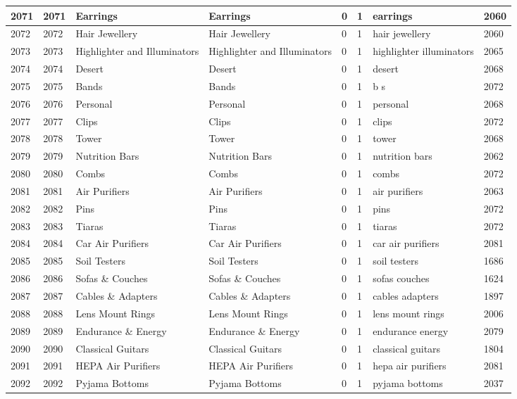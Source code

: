 \begin{longtable}{|l|l|l|l|l|l|l|l|}
2071 & 2071 & Earrings & Earrings & 0 & 1 & earrings & 2060 \\ \hline 
2072 & 2072 & Hair Jewellery & Hair Jewellery & 0 & 1 & hair jewellery & 2060 \\ \hline 
2073 & 2073 & Highlighter and Illuminators & Highlighter and Illuminators & 0 & 1 & highlighter illuminators & 2065 \\ \hline 
2074 & 2074 & Desert & Desert & 0 & 1 & desert & 2068 \\ \hline 
2075 & 2075 & Bands & Bands & 0 & 1 & b s & 2072 \\ \hline 
2076 & 2076 & Personal & Personal & 0 & 1 & personal & 2068 \\ \hline 
2077 & 2077 & Clips & Clips & 0 & 1 & clips & 2072 \\ \hline 
2078 & 2078 & Tower & Tower & 0 & 1 & tower & 2068 \\ \hline 
2079 & 2079 & Nutrition Bars & Nutrition Bars & 0 & 1 & nutrition bars & 2062 \\ \hline 
2080 & 2080 & Combs & Combs & 0 & 1 & combs & 2072 \\ \hline 
2081 & 2081 & Air Purifiers & Air Purifiers & 0 & 1 & air purifiers & 2063 \\ \hline 
2082 & 2082 & Pins & Pins & 0 & 1 & pins & 2072 \\ \hline 
2083 & 2083 & Tiaras & Tiaras & 0 & 1 & tiaras & 2072 \\ \hline 
2084 & 2084 & Car Air Purifiers & Car Air Purifiers & 0 & 1 & car air purifiers & 2081 \\ \hline 
2085 & 2085 & Soil Testers & Soil Testers & 0 & 1 & soil testers & 1686 \\ \hline 
2086 & 2086 & Sofas \& Couches & Sofas \& Couches & 0 & 1 & sofas couches & 1624 \\ \hline 
2087 & 2087 & Cables \& Adapters & Cables \& Adapters & 0 & 1 & cables adapters & 1897 \\ \hline 
2088 & 2088 & Lens Mount Rings & Lens Mount Rings & 0 & 1 & lens mount rings & 2006 \\ \hline 
2089 & 2089 & Endurance \& Energy & Endurance \& Energy & 0 & 1 & endurance energy & 2079 \\ \hline 
2090 & 2090 & Classical Guitars & Classical Guitars & 0 & 1 & classical guitars & 1804 \\ \hline 
2091 & 2091 & HEPA Air Purifiers & HEPA Air Purifiers & 0 & 1 & hepa air purifiers & 2081 \\ \hline 
2092 & 2092 & Pyjama Bottoms & Pyjama Bottoms & 0 & 1 & pyjama bottoms & 2037 \\ \hline 

\end{longtable}
